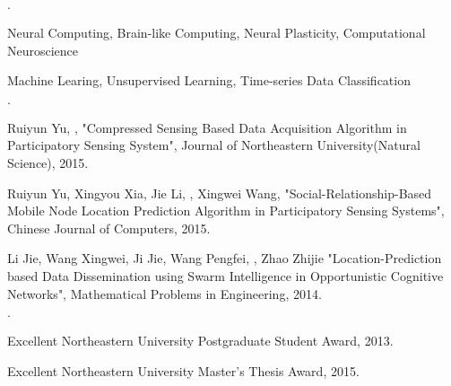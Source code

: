 \documentclass{joel_cv}
\begin{document}
\begin{cvHeader}
\end{cvHeader}


%
%

\begin{sectionItemize}{$\cdot$}
	\item Neural Computing, Brain-like Computing, Neural Plasticity, Computational Neuroscience
	\item Machine Learing, Unsupervised Learning, Time-series Data Classification
\end{sectionItemize}


%
%

\begin{sectionItemize}{$\cdot$}
	\item Ruiyun Yu, , "Compressed Sensing Based Data Acquisition Algorithm in Participatory Sensing System", Journal of Northeastern University(Natural Science), 2015.
	\item Ruiyun Yu, Xingyou Xia, Jie Li, , Xingwei Wang, "Social-Relationship-Based Mobile Node Location Prediction Algorithm in Participatory Sensing Systems", Chinese Journal of Computers, 2015. 
    \item Li Jie, Wang Xingwei, Ji Jie, Wang Pengfei, , Zhao Zhijie "Location-Prediction based Data Dissemination using Swarm Intelligence in Opportunistic Cognitive Networks", Mathematical Problems in Engineering, 2014.
\end{sectionItemize}


%
%

\begin{sectionItemize}{$\cdot$}
	\item Excellent Northeastern University Postgraduate Student Award, 2013.
    \item Excellent Northeastern University Master's Thesis Award, 2015.
\end{sectionItemize}


%
%
\end{document}
